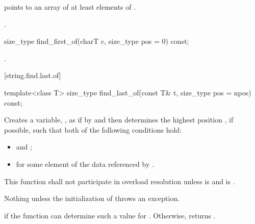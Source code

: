 \begin{itemdescr}
\pnum
\requires {} points to an array of at least 
elements of .

\pnum
\returns
{}.
\end{itemdescr}

%
\begin{itemdecl}
size_type find_first_of(charT c, size_type pos = 0) const;
\end{itemdecl}

\begin{itemdescr}
\pnum
\returns
{}.
\end{itemdescr}

[string.find.last.of]{}

%
\begin{itemdecl}
template<class T>
  size_type find_last_of(const T& t, size_type pos = npos) const;
\end{itemdecl}

\begin{itemdescr}
\pnum
\effects
Creates a variable, , as if by
 and then
determines the highest position , if possible, such that both of
the following conditions hold:
\begin{itemize}
\item
{}
and
;
\item
{}%
for some element  of the data referenced by .
\end{itemize}

\pnum
\remarks
This function shall not participate in overload resolution unless
 is  and
 is .

\pnum
\throws
Nothing unless the initialization of  throws an exception.

\pnum
\returns
{} if the function can determine such a value for .
Otherwise, returns
.
\end{itemdescr}

